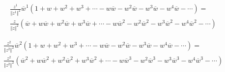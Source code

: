 \documentclass[12pt]{article}
\begin{document}
\begin{align}
&\frac{z^1}{\Vert z^1 \Vert^2} \overline{w}^1 (1 + w + w^2 + w^3 + \cdots - w\overline{w} - w^2\overline{w} - w^3 \overline{w} - w^4 \overline{w} - \cdots )=\\
& \frac{z}{\Vert z \Vert^2} (\overline{w} + w\overline{w} + w^2\overline{w} + w^3\overline{w} + \cdots - w\overline{w}^2 - w^2\overline{w}^2 - w^3 \overline{w}^2 - w^4 \overline{w}^2 -\cdots)
\end{align}

\begin{align}
&\frac{z^2}{\Vert z^2 \Vert^2} \overline{w}^2 (1 + w + w^2 + w^3 + \cdots - w\overline{w} - w^2\overline{w} - w^3 \overline{w} - w^4 \overline{w} - \cdots )=\\
& \frac{z^2}{\Vert z^2 \Vert^2} (\overline{w}^2 + w\overline{w}^2 + w^2\overline{w}^2 + w^3\overline{w}^2 + \cdots - w\overline{w}^3 - w^2\overline{w}^3 - w^3 \overline{w}^3 - w^4 \overline{w}^3 -\cdots)
\end{align}
\end{document}

